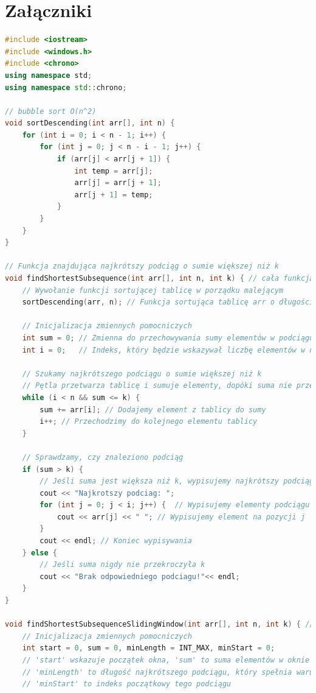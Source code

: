 \documentclass[12pt,twoside]{article}
\begin{document}
\section{Załączniki}
\centering
\begin{lstlisting}[language=C++, caption={main.cpp}, label={lst:program}]
#include <iostream>
#include <windows.h> 	
#include <chrono>
using namespace std;
using namespace std::chrono;

// bubble sort O(n^2)	
void sortDescending(int arr[], int n) { 
    for (int i = 0; i < n - 1; i++) {
        for (int j = 0; j < n - i - 1; j++) {
            if (arr[j] < arr[j + 1]) {
                int temp = arr[j];
                arr[j] = arr[j + 1];
                arr[j + 1] = temp;
            }
        }
    }
}

// Funkcja znajdująca najkrótszy podciąg o sumie większej niż k
void findShortestSubsequence(int arr[], int n, int k) { // cała funkcja ma złożoność O(n^2) przez sortowanie, gdyby zastosować quicksort O(n log n)
    // Wywołanie funkcji sortującej tablicę w porządku malejącym
    sortDescending(arr, n); // Funkcja sortująca tablicę arr o długości n w porządku malejącym

    // Inicjalizacja zmiennych pomocniczych
    int sum = 0; // Zmienna do przechowywania sumy elementów w podciągu
    int i = 0;   // Indeks, który będzie wskazywał liczbę elementów w najkrótszym podciągu

    // Szukamy najkrótszego podciągu o sumie większej niż k
    // Pętla przetwarza tablicę i sumuje elementy, dopóki suma nie przekroczy k
    while (i < n && sum <= k) {
        sum += arr[i]; // Dodajemy element z tablicy do sumy
        i++; // Przechodzimy do kolejnego elementu tablicy
    }

    // Sprawdzamy, czy znaleziono podciąg
    if (sum > k) {
        // Jeśli suma jest większa niż k, wypisujemy najkrótszy podciąg
        cout << "Najkrotszy podciag: ";
        for (int j = 0; j < i; j++) {  // Wypisujemy elementy podciągu
            cout << arr[j] << " "; // Wypisujemy element na pozycji j
        }
        cout << endl; // Koniec wypisywania
    } else {
        // Jeśli suma nigdy nie przekroczyła k
        cout << "Brak odpowiedniego podciagu!"<< endl;
    }
}

void findShortestSubsequenceSlidingWindow(int arr[], int n, int k) { // cała funkcja ma złożoność O(n) - każdy element jest przetwarzany maksymalnie raz
    // Inicjalizacja zmiennych pomocniczych
    int start = 0, sum = 0, minLength = INT_MAX, minStart = 0;
    // 'start' wskazuje początek okna, 'sum' to suma elementów w oknie
    // 'minLength' to długość najkrótszego podciągu, który spełnia warunek, domyślnie maksymalna wartość typu int
    // 'minStart' to indeks początkowy tego podciągu


\end{lstlisting}
\end{document}
